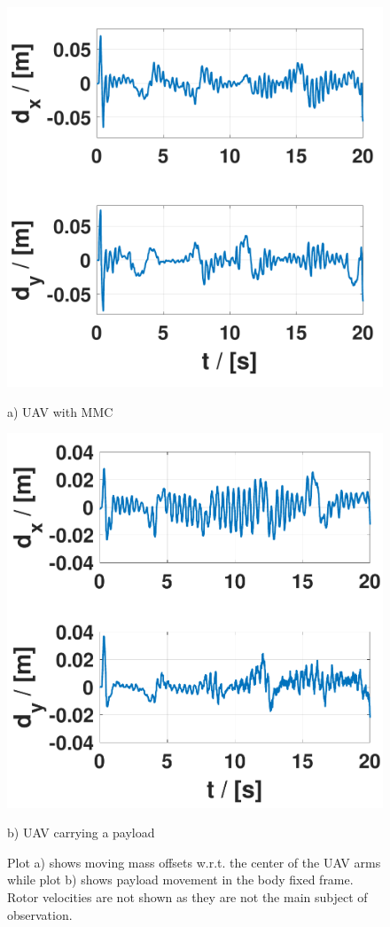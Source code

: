 \begin{figure}
	\centering
	\begin{minipage}{0.5\columnwidth}
		\centering
		\includegraphics[width=\columnwidth]{./pictures/mmcuav_control_inputs_crop.pdf}
		\caption*{a) UAV with MMC}
		\label{fig:mmcuav_control}
	\end{minipage}%
	\begin{minipage}{0.5\columnwidth}
		\centering
		\includegraphics[width=\columnwidth]{./pictures/mmuav_control_inputs_crop.pdf}
		\caption*{b) UAV carrying a payload}
		\label{fig:mmuav_control}
	\end{minipage}
	\caption{Plot a) shows moving mass offsets w.r.t. the center of the UAV arms while plot b) shows payload movement in the body fixed frame. Rotor velocities are not shown as they are not the main subject of observation. }
\end{figure}


